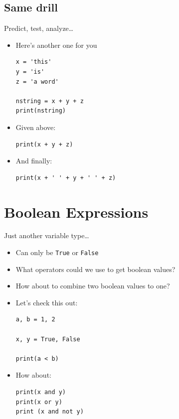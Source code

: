 \documentclass[11pt]{article}
\begin{document}
\subsection{Same drill}
\label{sec:org5baa393}
Predict, test, analyze\ldots{}

\begin{itemize}
\item Here's another one for you
\begin{verbatim}
x = 'this'
y = 'is'
z = 'a word'

nstring = x + y + z
print(nstring)
\end{verbatim}

\item Given above:
\begin{verbatim}
print(x + y + z)
\end{verbatim}

\item And finally:
\begin{verbatim}
print(x + ' ' + y + ' ' + z)
\end{verbatim}
\end{itemize}

\section{Boolean Expressions}
\label{sec:org399535b}
Just another variable type\ldots{}

\begin{itemize}
\item Can only be \texttt{True} or \texttt{False}
\item What operators could we use to get boolean values?
\item How about to combine two boolean values to one?
\item Let's check this out:
\begin{verbatim}
a, b = 1, 2

x, y = True, False

print(a < b)
\end{verbatim}
\item How about:
\begin{verbatim}
print(x and y)
print(x or y)
print (x and not y)
\end{verbatim}
\end{itemize}
\end{document}
